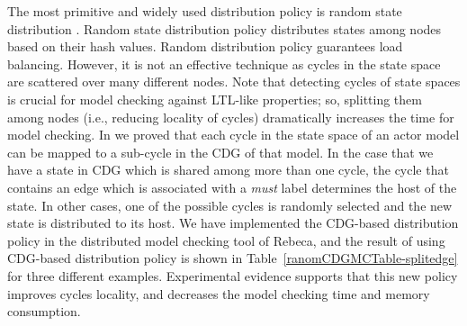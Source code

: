 The most primitive and widely used distribution policy is random state distribution \cite{DBLP:journals/entcs/GaravelMS13}. Random state distribution policy distributes states among nodes based on their hash values. Random distribution policy guarantees load balancing. However, it is not an effective technique as cycles in the state space are scattered over many different nodes. Note that detecting cycles of state spaces is crucial for model checking against LTL-like properties; so, splitting them among nodes (i.e., reducing locality of cycles) dramatically increases the time for model checking. %
In \cite{DBLP:journals/eceasst/KhamespanahSMSR15} we proved that each cycle in the state space of an actor model 
can be mapped to a sub-cycle
in the %
CDG of that model. 
%
In the case that we have a state in CDG  which is shared among more than one cycle, the cycle that contains an edge which is associated with a \emph{must} label determines the host of the state. 
%
 In other cases, one of the possible cycles is randomly selected and the new state is distributed to its host. We have implemented the CDG-based distribution policy in the distributed model checking tool of Rebeca, and the result of using CDG-based distribution policy is shown in Table~\ref{ranomCDGMCTable-splitedge} for three different examples. Experimental evidence supports that this new policy improves cycles locality, and decreases the model checking time and memory consumption. %

